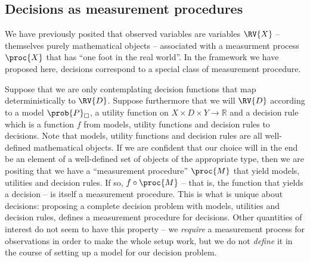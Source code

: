 

\subsection{Decisions as measurement procedures}

We have previously posited that observed variables are variables $\RV{X}$ -- themselves purely mathematical objects -- associated with a measurment process $\proc{X}$ that has ``one foot in the real world''. In the framework we have proposed here, decisions correspond to a special class of measurement procedure.

Suppose that we are only contemplating decision functions that map deterministically to $\RV{D}$. Suppose furthermore that we will $\RV{D}$ according to a model $\prob{P}_\square$, a utility function on $X\times D\times Y\to \mathbb{R}$ and a decision rule which is a function $f$ from models, utility functions and decision rules to decisions. Note that models, utility functions and decision rules are all well-defined mathematical objects. If we are confident that our choice will in the end be an element of a well-defined set of objects of the appropriate type, then we are positing that we have a ``measurement procedure'' $\proc{M}$ that yield models, utilities and decision rules. If so, $f\circ \proc{M}$ -- that is, the function that yields a decision -- is itself a measurement procedure. This is what is unique about decisions: proposing a complete decision problem with models, utilities and decision rules, defines a measurement procedure for decisions. Other quantities of interest do not seem to have this property -- we \emph{require} a measurement process for observations in order to make the whole setup work, but we do not \emph{define} it in the course of setting up a model for our decision problem.

